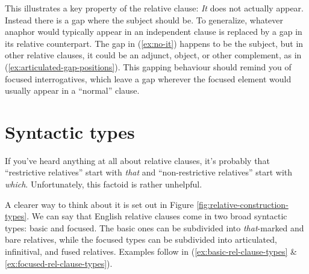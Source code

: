 \label{ex:no-it}
\z

This illustrates a key property of the relative clause: \textit{It} does not actually appear. Instead there is a gap where the subject should be. To generalize, whatever anaphor would typically appear in an independent clause is replaced by a gap in its relative counterpart. The gap in (\ref{ex:no-it}) happens to be the subject, but in other relative clauses, it could be an adjunct, object, or other complement, as in (\ref{ex:articulated-gap-positions}). This gapping behaviour should remind you of focused interrogatives, which leave a gap wherever the focused element would usually appear in a ``normal'' clause.

\ea \label{ex:articulated-gap-positions}
    \z
\z
{}

\section{Syntactic types}

If you've heard anything at all about relative clauses, it's probably that ``restrictive relatives'' start with \textit{that} and ``non-restrictive relatives'' start with \textit{which}. Unfortunately, this factoid is rather unhelpful.

A clearer way to think about it is set out in Figure \ref{fig:relative-construction-types}. We can say that English relative clauses come in two broad syntactic types: basic and focused. The basic ones can be subdivided into \textit{that}-marked and bare relatives, while the focused types can be subdivided into articulated, infinitival, and fused relatives. Examples follow in (\ref{ex:basic-rel-clause-types} \& \ref{ex:focused-rel-clause-types}).

